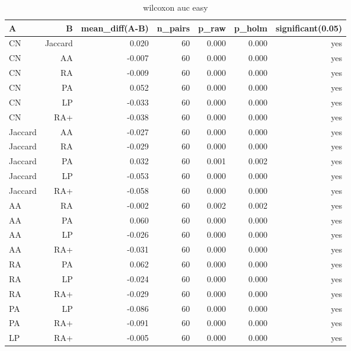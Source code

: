 \begin{table}[t]
\centering
\caption{wilcoxon auc easy}
\label{tab:wilcoxon_auc_easy}
\begin{tabular}{lrrrrrr}
\hline
A & B & mean\_diff(A-B) & n\_pairs & p\_raw & p\_holm & significant(0.05) \\
\hline
CN & Jaccard & 0.020 & 60 & 0.000 & 0.000 & yes \\
CN & AA & -0.007 & 60 & 0.000 & 0.000 & yes \\
CN & RA & -0.009 & 60 & 0.000 & 0.000 & yes \\
CN & PA & 0.052 & 60 & 0.000 & 0.000 & yes \\
CN & LP & -0.033 & 60 & 0.000 & 0.000 & yes \\
CN & RA+ & -0.038 & 60 & 0.000 & 0.000 & yes \\
Jaccard & AA & -0.027 & 60 & 0.000 & 0.000 & yes \\
Jaccard & RA & -0.029 & 60 & 0.000 & 0.000 & yes \\
Jaccard & PA & 0.032 & 60 & 0.001 & 0.002 & yes \\
Jaccard & LP & -0.053 & 60 & 0.000 & 0.000 & yes \\
Jaccard & RA+ & -0.058 & 60 & 0.000 & 0.000 & yes \\
AA & RA & -0.002 & 60 & 0.002 & 0.002 & yes \\
AA & PA & 0.060 & 60 & 0.000 & 0.000 & yes \\
AA & LP & -0.026 & 60 & 0.000 & 0.000 & yes \\
AA & RA+ & -0.031 & 60 & 0.000 & 0.000 & yes \\
RA & PA & 0.062 & 60 & 0.000 & 0.000 & yes \\
RA & LP & -0.024 & 60 & 0.000 & 0.000 & yes \\
RA & RA+ & -0.029 & 60 & 0.000 & 0.000 & yes \\
PA & LP & -0.086 & 60 & 0.000 & 0.000 & yes \\
PA & RA+ & -0.091 & 60 & 0.000 & 0.000 & yes \\
LP & RA+ & -0.005 & 60 & 0.000 & 0.000 & yes \\
\hline
\end{tabular}
\end{table}